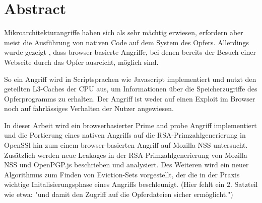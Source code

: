 \chapter*{Abstract}


Mikroarchitekturangriffe haben sich als sehr mächtig erwiesen, erfordern aber meist die Ausführung von nativen Code auf dem System des Opfers.
Allerdings wurde gezeigt \cite{TheSpyInTheSandbox}, dass browser-basierte Angriffe, bei denen bereits der Besuch einer Webseite durch das Opfer ausreicht, möglich sind.

So ein Angriff wird in Scriptsprachen wie Javascript implementiert und nutzt den geteilten L3-Caches der CPU aus, um Informationen über die Speicherzugriffe des Opferprogramms zu erhalten.
Der Angriff ist weder auf einen Exploit im Browser noch auf fahrlässiges Verhalten der Nutzer angewiesen.




In dieser Arbeit wird ein browserbasierter Prime and probe Angriff implementiert und die Portierung eines nativen Angriffs auf die RSA-Primzahlgenerierung \cite{RSAKeyGeneration2} in OpenSSl hin zum einem browser-basierten Angriff auf Mozilla NSS untersucht.
Zusätzlich werden neue Leakages in der RSA-Primzahlgenerierung von Mozilla NSS und OpenPGP.js beschrieben und analysiert.
Des Weiteren wird ein neuer Algorithmus zum Finden von Eviction-Sets vorgestellt, der die in der Praxis wichtige Initalisierungsphase eines Angriffs beschleunigt. (Hier fehlt ein 2. Satzteil wie etwa: "und damit den Zugriff auf die Opferdateien sicher ermöglicht.") 